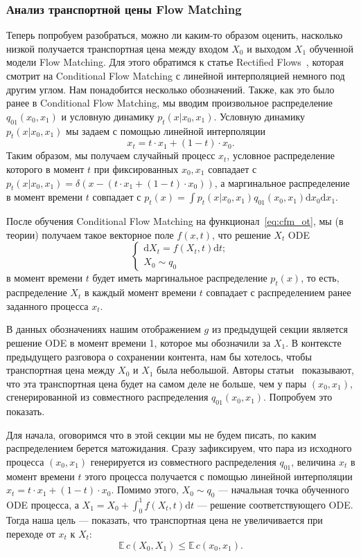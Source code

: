\documentclass[12pt]{article}
\theoremstyle{definition}
\begin{document}
\subsubsection{Анализ транспортной цены Flow Matching}
Теперь попробуем разобраться, можно ли каким-то образом оценить, насколько низкой получается транспортная цена между входом $X_0$ и выходом $X_1$ обученной модели Flow Matching. Для этого обратимся к статье Rectified Flows~\cite{liu2022flow}, которая смотрит на Conditional Flow Matching с линейной интерполяцией немного под другим углом.
Нам понадобится несколько обозначений. Также, как это было ранее в Conditional Flow Matching, мы вводим произвольное распределение $q_{01}(x_0, x_1)$ и условную динамику $p_t(x | x_0, x_1)$. Условную динамику $p_t(x | x_0, x_1)$ мы задаем с помощью линейной интерполяции
\[
    x_t = t \cdot x_1 + (1 - t) \cdot x_0.
\]
Таким образом, мы получаем случайный процесс $x_t$, условное распределение которого в момент $t$ при фиксированных $x_0, x_1$ совпадает с $p_t(x | x_0, x_1) = \delta(x - (t \cdot x_1 + (1 - t) \cdot x_0))$, а маргинальное распределение в момент времени $t$ совпадает с $p_t(x) = \int p_t(x | x_0, x_1)q_{01}(x_0, x_1) \mathrm{d}x_0 \mathrm{d}x_1$. 

После обучения Conditional Flow Matching на функционал~\ref{eq:cfm_ot}, мы (в теории) получаем такое векторное поле $f(x, t)$, что решение $X_t$ ODE
\[
\begin{cases}
    \mathrm{d} X_t = f(X_t, t) \mathrm{d} t;\\
    X_0 \sim q_0
\end{cases}
\]
в момент времени $t$ будет иметь маргинальное распределение $p_t(x)$, то есть, распределение $X_t$ в каждый момент времени $t$ совпадает с распределением ранее заданного процесса $x_t$.

В данных обозначениях нашим отображением $g$ из предыдущей секции является решение ODE в момент времени 1, которое мы обозначили за $X_1$. В контексте предыдущего разговора о сохранении контента, нам бы хотелось, чтобы транспортная цена между $X_0$ и $X_1$ была небольшой. Авторы статьи~\cite{liu2022flow} показывают, что эта транспортная цена будет на самом деле не больше, чем у пары $(x_0, x_1)$, сгенерированной из совместного распределения $q_{01}(x_0, x_1)$. Попробуем это показать.

Для начала, оговоримся что в этой секции мы не будем писать, по каким распределением берется матожидания. Сразу зафиксируем, что пара из исходного процесса $(x_0, x_1)$ генерируется из совместного распределения $q_{01}$, величина $x_t$ в момент времени $t$ этого процесса получается с помощью линейной интерполяции $x_t = t \cdot x_1 + (1 - t) \cdot x_0$. Помимо этого, $X_0 \sim q_0$ --- начальная точка обученного ODE процесса, а $X_1 = X_0 + \int_{0}^1 f(X_t, t) \mathrm{d} t$ --- решение соответствующего ODE. Тогда наша цель --- показать, что транспортная цена не увеличивается при переходе от $x_t$ к $X_t$:
\[
    \mathbb{E}\, c(X_0, X_1) \leq \mathbb{E}\,c(x_0, x_1).
\]
\end{document}
